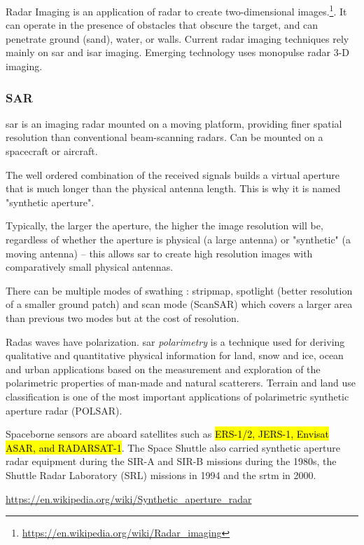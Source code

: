 \documentclass{article}
\begin{document}
Radar Imaging is an application of radar to create two-dimensional images.\footnote{\url{https://en.wikipedia.org/wiki/Radar_imaging}}. It can operate in the presence of obstacles that obscure the target, and can penetrate ground (sand), water, or walls. Current radar imaging techniques rely mainly on \ac{sar} and \ac{isar} imaging. Emerging technology uses monopulse radar 3-D imaging.

\subsubsection{SAR}

\ac{sar} is an imaging radar mounted on a moving platform, providing finer spatial resolution than conventional beam-scanning radars. Can be mounted on a spacecraft or aircraft. 

The well ordered combination of the received signals builds a virtual aperture that is much longer than the physical antenna length. This is why it is named "synthetic aperture". 

Typically, the larger the aperture, the higher the image resolution will be, regardless of whether the aperture is physical (a large antenna) or "synthetic" (a moving antenna) – this allows \ac{sar} to create high resolution images with comparatively small physical antennas.

There can be multiple modes of swathing : stripmap, spotlight (better resolution of a smaller ground patch) and scan mode (ScanSAR) which covers a larger area than previous two modes but at the cost of resolution.

Radas waves have polarization. \ac{sar} \textit{polarimetry} is a technique used for deriving qualitative and quantitative physical information for land, snow and ice, ocean and urban applications based on the measurement and exploration of the polarimetric properties of man-made and natural scatterers. Terrain and land use classification is one of the most important applications of polarimetric synthetic aperture radar (POLSAR).

Spaceborne sensors are aboard satellites such as \hl{ERS-1/2, JERS-1, Envisat ASAR, and RADARSAT-1}. The Space Shuttle also carried synthetic aperture radar equipment during the SIR-A and SIR-B missions during the 1980s, the Shuttle Radar Laboratory (SRL) missions in 1994 and the \ac{srtm} in 2000.

\url{https://en.wikipedia.org/wiki/Synthetic_aperture_radar}
\end{document}
